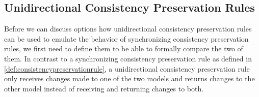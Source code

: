 



\subsection{Unidirectional Consistency Preservation Rules}

Before we can discuss options how unidirectional consistency preservation rules can be used to emulate the behavior of synchronizing consistency preservation rules, we first need to define them to be able to formally compare the two of them.
In contrast to a synchronizing consistency preservation rule as defined in \autoref{def:consistencypreservationrule}, a unidirectional consistency preservation rule only receives changes made to one of the two models and returns changes to the other model instead of receiving and returning changes to both.

